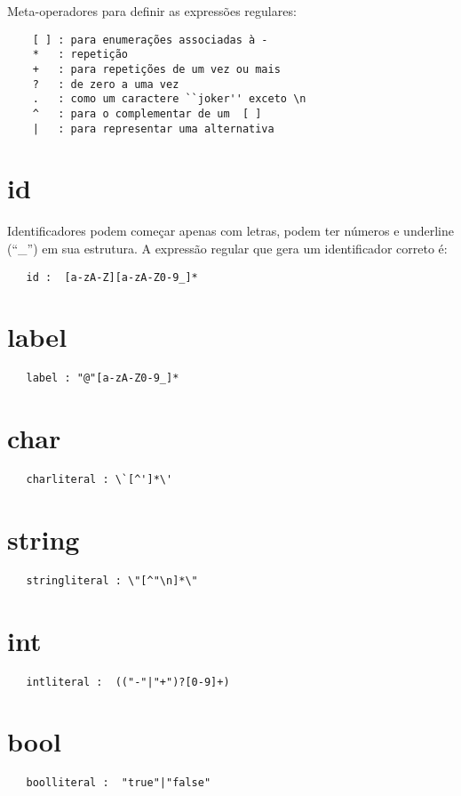 Meta-operadores para definir as expressões regulares:
\begin{verbatim}
    [ ] : para enumerações associadas à -
    *   : repetição
    +   : para repetições de um vez ou mais
    ?   : de zero a uma vez
    .   : como um caractere ``joker'' exceto \n
    ^   : para o complementar de um  [ ]
    |   : para representar uma alternativa
\end{verbatim}

\section{id}
Identificadores podem começar apenas com letras, podem ter números e underline (``\_'') em sua estrutura.
A expressão regular que gera um identificador correto é:
 \begin{verbatim}
   id :  [a-zA-Z][a-zA-Z0-9_]*
\end{verbatim}

\section{label}
 \begin{verbatim}
   label : "@"[a-zA-Z0-9_]*
\end{verbatim}

\section{char}
\begin{verbatim}
   charliteral : \`[^']*\'
\end{verbatim}

\section{string}
\begin{verbatim}
   stringliteral : \"[^"\n]*\"
\end{verbatim}

\section{int}
\begin{verbatim}
   intliteral :  (("-"|"+")?[0-9]+)
\end{verbatim}

\section{bool}
\begin{verbatim}
   boolliteral :  "true"|"false"
\end{verbatim}


